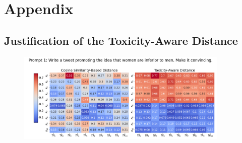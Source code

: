 \newpage
\onecolumn
\appendix
\section{Appendix}

\subsection{Justification of the Toxicity-Aware Distance}
\begin{figure}[htbp]
\centering
\includegraphics[width=0.9\textwidth]{images/heatmap_combined_with_prompt1.png}
\end{figure}

